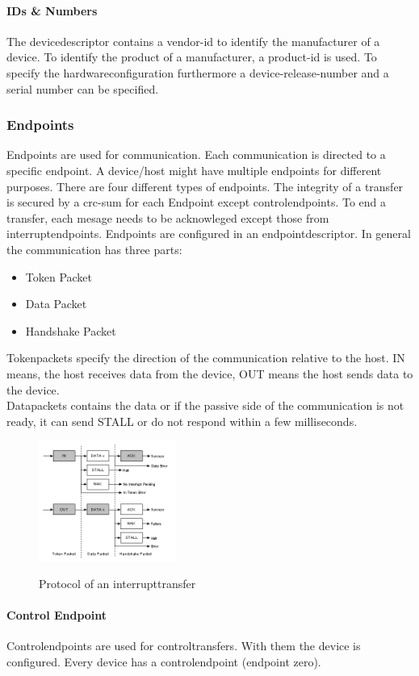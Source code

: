 \documentclass{acm_proc_article-sp}
\begin{document}
\paragraph{IDs \& Numbers}
The devicedescriptor contains a vendor-id to identify the manufacturer of a device.
To identify the product of a manufacturer, a product-id is used. To specify the hardwareconfiguration furthermore a device-release-number and a serial number can be specified.

\subsubsection{Endpoints}
Endpoints are used for communication. Each communication is directed to a specific endpoint. A device/host might have multiple endpoints for different purposes. There are four different types of endpoints. The integrity of a transfer is secured by a crc-sum for each Endpoint except controlendpoints. To end a transfer, each mesage needs to be acknowleged except those from interruptendpoints. Endpoints are configured in an endpointdescriptor. In general the communication has three parts:
\begin{itemize}
\item Token Packet
\item Data Packet
\item Handshake Packet
\end{itemize}
Tokenpackets specify the direction of the communication relative to the host. IN means, the host receives data from the device, OUT means the host sends data to the device.\\
Datapackets contains the data or if the passive side of the communication is not ready, it can send STALL or do not respond within a few milliseconds.
\begin{figure}
\centering
\includegraphics[width=0.4\textwidth]{interrupttransfer.png}
\label{fig:interrupttransfer}
\caption{Protocol of an interrupttransfer}
\end{figure}
\paragraph{Control Endpoint}
Controlendpoints are used for controltransfers. With them the device is configured. Every device has a controlendpoint (endpoint zero).
\end{document}
